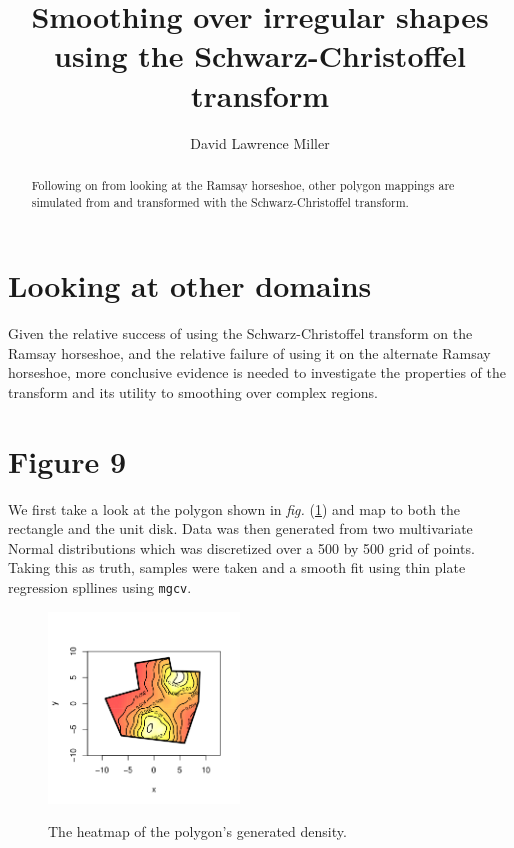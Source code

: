 \documentclass[a4paper,10pt]{amsart}
\title{Smoothing over irregular shapes using the Schwarz-Christoffel transform}
\author{David Lawrence Miller}
\newcommand{\sch}{Schwarz-Christoffel }
\newcommand{\fig}[1]{\emph{fig.} (\ref{#1})}
\begin{document}
\begin{abstract}
Following on from looking at the Ramsay horseshoe, other polygon mappings are simulated from and transformed with the \sch transform.
\end{abstract}


\newtheorem{thm}{Theorem}[section]

\newtheorem{defn}{Definition}[section]

\maketitle



\section{Looking at other domains}

Given the relative success of using the \sch transform on the Ramsay horseshoe, and the relative failure of using it on the alternate Ramsay horseshoe, more conclusive evidence is needed to investigate the properties of the transform and its utility to smoothing over complex regions.

\section{Figure 9}

We first take a look at the polygon shown in \fig{fig9} and map to both the rectangle and the unit disk. Data was then generated from two multivariate Normal distributions which was discretized over a 500 by 500 grid of points. Taking this as truth, samples were taken and a smooth fit using thin plate regression spllines using \texttt{mgcv}.


\begin{figure}
\centering
\includegraphics[width=2in]{figs-otherdomains/fig9.png} \\
\caption{The heatmap of the polygon's generated density.}
\label{fig9}
\end{figure}
\end{document}
